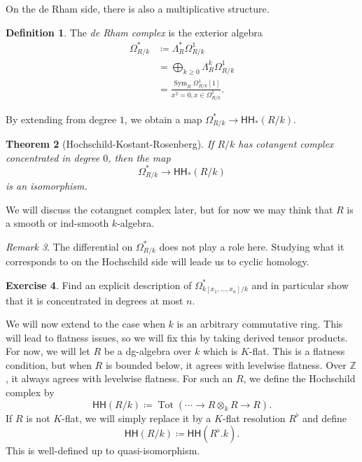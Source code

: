 \documentclass[10pt, oneside]{memoir}
\newtheorem{thm}{Theorem}[subsection]
\theoremstyle{definition}
\newtheorem{defn}[thm]{Definition}
\newtheorem{exer}[thm]{Exercise}
\theoremstyle{remark}
\newtheorem{rmk}[thm]{Remark}
\theoremstyle{plain}
\theoremstyle{definition}
\theoremstyle{remark}
\newcommand{\Z}{\mathbb{Z}}
\newcommand{\ms}[1]{\mathsf{#1}}
\newcommand{\1}{\mathbf{1}}
\newcommand{\2}{\mathbf{2}}
\newcommand{\3}{\mathbf{3}}
\newcommand{\HH}{\ms{HH}}
\DeclareMathOperator{\Sym}{Sym}
\DeclareMathOperator{\Tot}{Tot}
\begin{document}
On the de Rham side, there is also a multiplicative structure.
\begin{defn}
    The \textit{de Rham complex} is the exterior algebra
    \begin{align*}
        \Omega^*_{R/k} &\coloneqq \Lambda_R^* \Omega^1_{R/k} \\
        &= \bigoplus_{k \geq 0} \Lambda_R^k \Omega^1_{R/k} \\
        &= \frac{\Sym_R \Omega^1_{R/k}[1]}{x^2 = 0, x \in \Omega^1_{R/k}}.
    \end{align*}
\end{defn}

By extending from degree \(1 \), we obtain a map \(\Omega^*_{R/k} \to \HH_*(R/k) \).

\begin{thm}[Hochschild-Kostant-Rosenberg]\label{thm:hkr}
    If \(R/k \) has cotangent complex concentrated in degree \(0 \), then the map
    \[ \Omega^*_{R/k} \to \HH_*(R/k) \]
    is an isomorphism.
\end{thm}

We will discuss the cotangnet complex later, but for now we may think that \(R \) is a smooth or ind-smooth \(k \)-algebra.

\begin{rmk}
    The differential on \(\Omega^*_{R/k} \) does not play a role here. Studying what it corresponds to on the Hochschild side will leade us to cyclic homology.
\end{rmk}

\begin{exer}
    Find an explicit description of \(\Omega^*_{k[x_1, \ldots, x_n]/k} \) and in particular show that it is concentrated in degrees at most \(n \).
\end{exer}

We will now extend to the case when \(k \) is an arbitrary commutative ring. This will lead to flatness issues, so we will fix this by taking derived tensor products. For now, we will let \(R \) be a dg-algebra over \(k \) which is \(K \)-flat. This is a flatness condition, but when \(R \) is bounded below, it agrees with levelwise flatness. Over \(\Z \), it always agrees with levelwise flatness. For such an \(R \), we define the Hochschild complex by
\[ \HH(R/k) \coloneqq \Tot(\cdots \to R \otimes_k R \to R). \]
If \(R \) is not \(K \)-flat, we will simply replace it by a \(K \)-flat resolution \(R^{\flat} \) and define
\[ \HH(R/k) \coloneqq \HH(R^{\flat}.k). \]
This is well-defined up to quasi-isomorphism.
\end{document}
